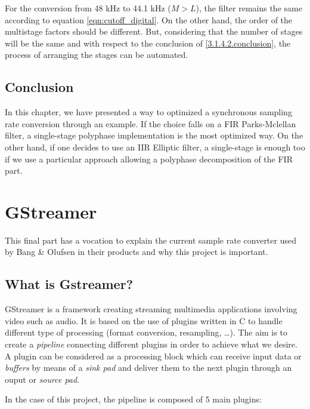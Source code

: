 For the conversion from 48 kHz to 44.1 kHz ($M > L$), the filter remains the same according to equation \ref{eqn:cutoff_digital}. On the other hand, the order of the multistage factors should be different. But, considering that the number of stages will be the same and with respect to the conclusion of \ref{3.1.4.2.conclusion}, the process of arranging the stages can be automated. 

\subsection{Conclusion}

In this chapter, we have presented a way to optimized a synchronous sampling rate conversion through an example. If the choice falls on a FIR Parks-Mclellan filter, a single-stage polyphase implementation is the most optimized way. On the other hand, if one decides to use an IIR Elliptic filter, a single-stage is enough too if we use a particular approach allowing a polyphase decomposition of the FIR part. 








\section{GStreamer}


This final part has a vocation to explain the current sample rate converter used by Bang \& Olufsen in their products and why this project is important. \\

\subsection{What is Gstreamer?}

GStreamer is a framework creating streaming multimedia applications involving video such as audio. It is based on the use of plugins written in C to handle different type of processing (format conversion, resampling, \dots). The aim is to create a \textit{pipeline} connecting different plugins in order to achieve what we desire. A plugin can be considered as a processing block which can receive input data or \textit{buffers} by means of a \textit{sink pad} and deliver them to the next plugin through an ouput or \textit{source pad}.

In the case of this project, the pipeline is composed of 5 main plugins:


